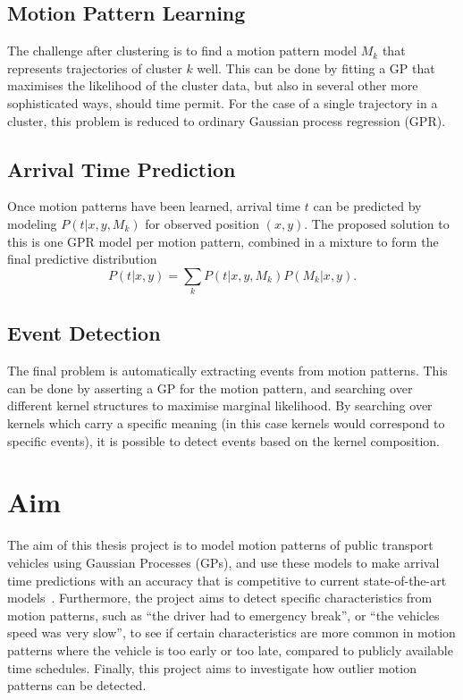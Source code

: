 \subsection{Motion Pattern Learning}
The challenge after clustering is to find a motion
pattern model $M_k$ that represents trajectories of cluster $k$ well. 
This can be done by fitting a GP
that maximises the likelihood of the cluster data, but also in several
other more sophisticated ways, should time permit. For the case of a single trajectory in
a cluster, this problem is reduced to ordinary Gaussian
process regression (GPR).

\subsection{Arrival Time Prediction}
Once motion patterns have been learned, arrival time $t$ can be predicted
by modeling $P(t | x, y, M_k)$ for observed position $(x, y)$. The proposed solution to this is one GPR
model per motion pattern, combined in a mixture to form the final
predictive distribution
\[P(t | x, y) = \sum_{k} P(t | x, y, M_k)P(M_k | x, y).\]

\subsection{Event Detection}
The final problem is automatically extracting events from motion
patterns. This can be done by asserting a GP for the motion pattern,
and searching over different kernel structures to maximise marginal
likelihood. By searching over kernels which carry a specific meaning (in this case
kernels would correspond to specific events), it is possible to
detect events based on the kernel composition.

\section{Aim}
\label{sec:aim}
The aim of this thesis project is to model motion patterns of public
transport vehicles using Gaussian Processes (GPs), and use these
models to make arrival time predictions with an accuracy that is
competitive to current state-of-the-art models~\cite{Sinn2012Sep,
  Gurmu2014, pang2018learning}. Furthermore, the project aims to
detect specific characteristics from motion patterns, such as ``the
driver had to emergency break'', or ``the vehicles speed was very slow'', to see if certain characteristics
are more common in motion patterns where the vehicle is too early or
too late, compared to publicly available time schedules. Finally, this
project aims to investigate how outlier motion patterns can be
detected.

